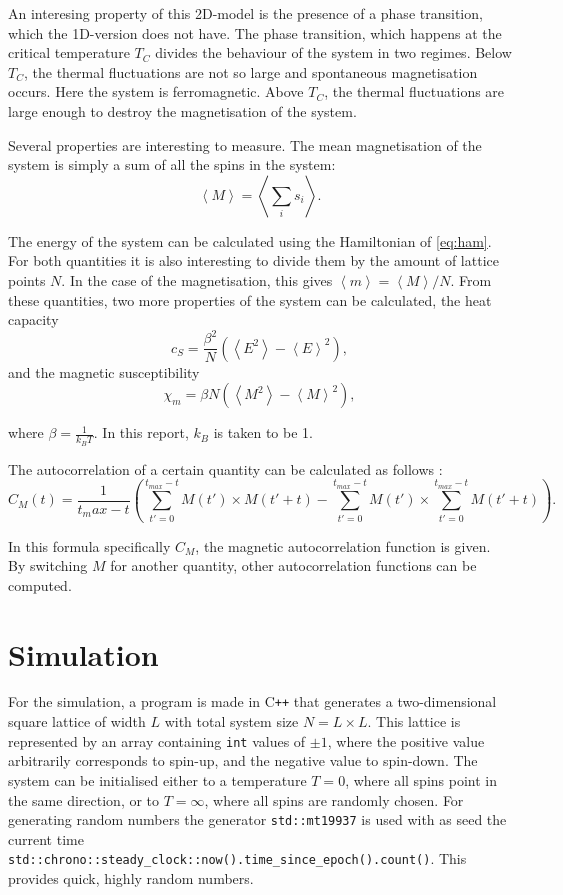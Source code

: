 \documentclass[a4paper]{article}
\begin{document}
An interesing property of this 2D-model is the presence of a phase transition, which the 1D-version does not have. The phase transition, which happens at the critical temperature $T_C$ divides the behaviour of the system in two regimes. Below $T_C$, the thermal fluctuations are not so large and spontaneous magnetisation occurs. Here the system is ferromagnetic. Above $T_C$, the thermal fluctuations are large enough to destroy the magnetisation of the system.

Several properties are interesting to measure. The mean magnetisation of the system is simply a sum of all the spins in the system:
\begin{equation} \label{eq:M}
	\left< M \right> = \left< \sum_{i} s_i \right>.
\end{equation}

The energy of the system can be calculated using the Hamiltonian of \autoref{eq:ham}. For both quantities it is also interesting to divide them by the amount of lattice points $N$. In the case of the magnetisation, this gives $\left< m\right>=\left< M \right>/N$. From these quantities, two more properties of the system can be calculated, the heat capacity 
\begin{equation}
	c_S = \frac{\beta^2}{N} \left( \left<E^2\right> -\left<E\right>^2\right), 
\end{equation}
and the magnetic susceptibility 
\begin{equation}
 \chi_m = \beta N \left( \left<M^2\right> -\left<M\right>^2\right),
\end{equation}

where $\beta=\frac{1}{k_B T}$. In this report, $k_B$ is taken to be 1.

The autocorrelation of a certain quantity can be calculated as follows \cite{newman1999monte}:
\begin{equation}
C_M(t)= \frac{1}{t_max-t} \left( \sum_{t'=0}^{t_{max}-t} M(t')\times M(t'+t)- \sum_{t'=0}^{t_{max}-t} M(t') \times \sum_{t'=0}^{t_{max}-t} M(t'+t) \right).
\end{equation}

In this formula specifically $C_M$, the magnetic autocorrelation function is given. By switching $M$ for another quantity, other autocorrelation functions can be computed.

\section{Simulation}
For the simulation, a program is made in C\texttt{++} that generates a two-dimensional square lattice of width $L$ with total system size $N=L\times L$. This lattice is represented by an array containing \texttt{int} values of $\pm1$, where the positive value arbitrarily corresponds to spin-up, and the negative value to spin-down. The system can be initialised either to a temperature $T=0$, where all spins point in the same direction, or to $T=\infty$, where all spins are randomly chosen. For generating random numbers the generator \texttt{std::mt19937} is used with as seed the current time \texttt{std::chrono::steady\_clock::now().time\_since\_epoch().count()}. This provides quick, highly random numbers.
\end{document}
